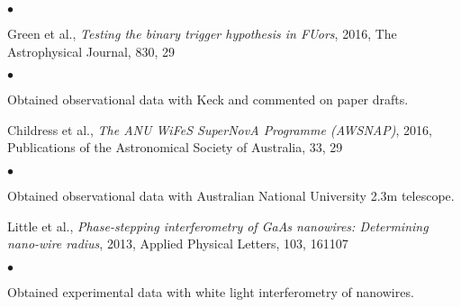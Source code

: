 \documentclass[margin,line]{res}
\newenvironment{list1}{
	\begin{list}{\ding{113}}{%
			\setlength{\itemsep}{0in}
			\setlength{\parsep}{0in} \setlength{\parskip}{0in}
			\setlength{\topsep}{0in} \setlength{\partopsep}{0in} 
			\setlength{\leftmargin}{0.17in}}}{\end{list}}
\newenvironment{list2}{
	\begin{list}{$\bullet$}{%
			\setlength{\itemsep}{0in}
			\setlength{\parsep}{0in} \setlength{\parskip}{0in}
			\setlength{\topsep}{0in} \setlength{\partopsep}{0in} 
			\setlength{\leftmargin}{0.2in}}}{\end{list}}
\begin{document}
\begin{resume}
\begin{list1}
\begin{list2}
	\end{list2}
	\item[] Green et al., \emph{Testing the binary trigger hypothesis in FUors}, 2016, The Astrophysical Journal, 830, 29
	\begin{list2}
		\item Obtained observational data with Keck and commented on paper drafts.\\
	\end{list2}
	\item[] Childress et al., \emph{The ANU WiFeS SuperNovA Programme (AWSNAP)}, 2016, Publications of the Astronomical Society of Australia, 33, 29
	\begin{list2}
		\item Obtained observational data with Australian National University 2.3m telescope.\\
	\end{list2}
	\item[] Little et al., \emph{Phase-stepping interferometry of GaAs nanowires: Determining nano-wire radius}, 2013, Applied Physical Letters, 103, 161107
	\begin{list2}
		\item Obtained experimental data with white light interferometry of nanowires.\\
	\end{list2}
\end{list1}
		
		
		

\end{resume}
\end{document}
